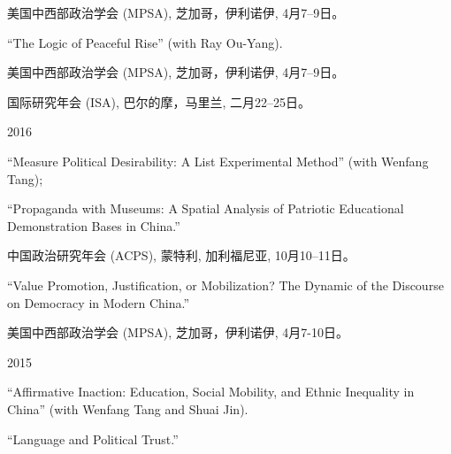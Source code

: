 \documentclass[10.5pt,]{article}
\providecommand{\tightlist}{%
	\setlength{\itemsep}{0pt}\setlength{\parskip}{0pt}}
\renewenvironment{itemize}{
	\begin{list}{}{
			\setlength{\leftmargin}{1.5em}
		}
	}{
	\end{list}
}
\begin{document}
\begin{itemize}
\begin{itemize}
    \begin{itemize}
    \tightlist
    \item
      \footnotesize 美国中西部政治学会 (MPSA), 芝加哥，伊利诺伊,
      4月7--9日。
    \end{itemize}
  \item
    ``The Logic of Peaceful Rise'' (with Ray Ou-Yang).

    \begin{itemize}
    \tightlist
    \item
      \footnotesize 美国中西部政治学会 (MPSA), 芝加哥，伊利诺伊,
      4月7--9日。
    \item
      \footnotesize 国际研究年会 (ISA), 巴尔的摩，马里兰, 二月22--25日。
    \end{itemize}
  \end{itemize}
\item
  2016

  \begin{itemize}
  \tightlist
  \item
    ``Measure Political Desirability: A List Experimental Method'' (with
    Wenfang Tang);
  \item
    ``Propaganda with Museums: A Spatial Analysis of Patriotic
    Educational Demonstration Bases in China.''

    \begin{itemize}
    \tightlist
    \item
      \footnotesize 中国政治研究年会 (ACPS), 蒙特利, 加利福尼亚,
      10月10--11日。
    \end{itemize}
  \item
    ``Value Promotion, Justification, or Mobilization? The Dynamic of
    the Discourse on Democracy in Modern China.''

    \begin{itemize}
    \tightlist
    \item
      \footnotesize 美国中西部政治学会 (MPSA), 芝加哥，伊利诺伊,
      4月7-10日。
    \end{itemize}
  \end{itemize}
\item
  2015

  \begin{itemize}
  \tightlist
  \item
    ``Affirmative Inaction: Education, Social Mobility, and Ethnic
    Inequality in China'' (with Wenfang Tang and Shuai Jin).
  \item
    ``Language and Political Trust.''


\end{itemize}
\end{itemize}
\end{document}
